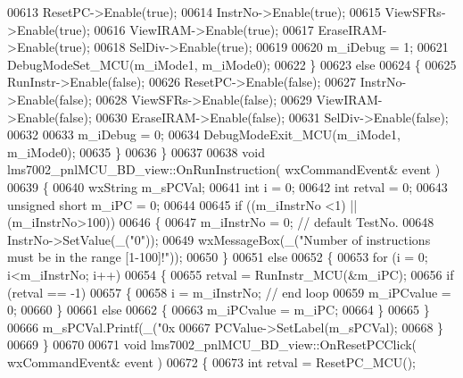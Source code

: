 \begin{DoxyCode}
{{{{{{{{{{{{{{00613         ResetPC->Enable(\textcolor{keyword}{true});
00614         InstrNo->Enable(\textcolor{keyword}{true});
00615         ViewSFRs->Enable(\textcolor{keyword}{true});
00616         ViewIRAM->Enable(\textcolor{keyword}{true});
00617         EraseIRAM->Enable(\textcolor{keyword}{true});
00618         SelDiv->Enable(\textcolor{keyword}{true});
00619 
00620         m_iDebug = 1;
00621         DebugModeSet_MCU(m_iMode1, m_iMode0);
00622     \}
00623     \textcolor{keywordflow}{else}
00624     \{
00625         RunInstr->Enable(\textcolor{keyword}{false});
00626         ResetPC->Enable(\textcolor{keyword}{false});
00627         InstrNo->Enable(\textcolor{keyword}{false});
00628         ViewSFRs->Enable(\textcolor{keyword}{false});
00629         ViewIRAM->Enable(\textcolor{keyword}{false});
00630         EraseIRAM->Enable(\textcolor{keyword}{false});
00631         SelDiv->Enable(\textcolor{keyword}{false});
00632 
00633         m_iDebug = 0;
00634         DebugModeExit_MCU(m_iMode1, m_iMode0);
00635     \}
00636 \}
00637 
00638 \textcolor{keywordtype}{void} lms7002_pnlMCU_BD_view::OnRunInstruction( wxCommandEvent& event )
00639 \{
00640     wxString m\_sPCVal;
00641     \textcolor{keywordtype}{int} i = 0;
00642     \textcolor{keywordtype}{int} retval = 0;
00643     \textcolor{keywordtype}{unsigned} \textcolor{keywordtype}{short} m\_iPC = 0;
00644 
00645     \textcolor{keywordflow}{if} ((m_iInstrNo <1) || (m_iInstrNo>100))
00646     \{
00647         m_iInstrNo = 0; \textcolor{comment}{// default TestNo.}
00648         InstrNo->SetValue(\_(\textcolor{stringliteral}{"0"}));
00649         wxMessageBox(\_(\textcolor{stringliteral}{"Number of instructions must be in the range [1-100]!"}));
00650     \}
00651     \textcolor{keywordflow}{else}
00652     \{
00653         \textcolor{keywordflow}{for} (i = 0; i<m_iInstrNo; i++)
00654         \{
00655             retval = RunInstr_MCU(&m\_iPC);
00656             \textcolor{keywordflow}{if} (retval == -1)
00657             \{
00658                 i = m_iInstrNo; \textcolor{comment}{// end loop}
00659                 m_iPCvalue = 0;
00660             \}
00661             \textcolor{keywordflow}{else}
00662             \{
00663                 m_iPCvalue = m\_iPC;
00664             \}
00665         \}
00666         m\_sPCVal.Printf(\_(\textcolor{stringliteral}{"0x%
00667         PCValue->SetLabel(m\_sPCVal);
00668     \}
00669 \}
00670 
00671 \textcolor{keywordtype}{void} lms7002_pnlMCU_BD_view::OnResetPCClick( wxCommandEvent& event )
00672 \{
00673     \textcolor{keywordtype}{int} retval = ResetPC_MCU();
}}}}}}}}}}}}}}}
\end{DoxyCode}
